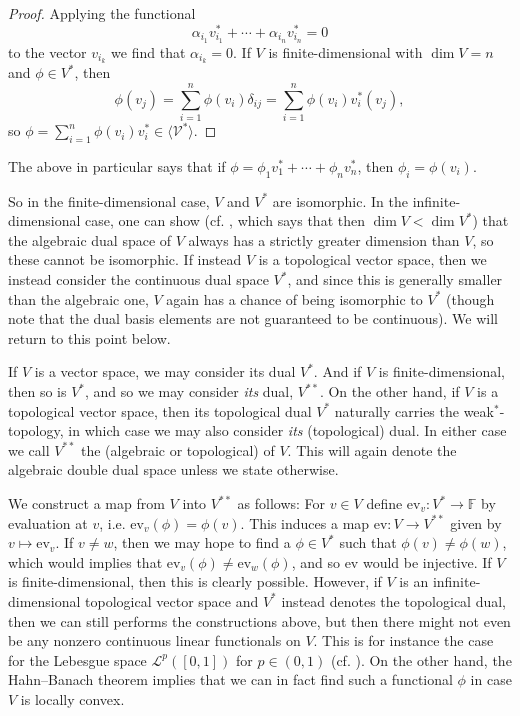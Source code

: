 \documentclass[a4paper, 11pt]{memoir}
\newcommand{\ev}{\mathrm{ev}}
\newcommand{\gen}[1]{\langle#1\rangle}
\theoremstyle{plaincustomnumber}
\theoremstyle{changedotbreakcustomnumber}
\newcommand{\calL}{\mathcal{L}}
\newcommand{\calV}{\mathcal{V}}
\newcommand{\field}{\mathbb{F}}
\newcommand{\keyword}[1]{\ifbool{indefinition}{{\itshape #1}}{{\itshape\bfseries #1}}}
\begin{document}
\begin{proof}
    Applying the functional
    \begin{equation*}
        \alpha_{i_1} v_{i_1}^* + \cdots + \alpha_{i_n} v_{i_n}^* = 0
    \end{equation*}
    to the vector $v_{i_k}$ we find that $\alpha_{i_k} = 0$. If $V$ is finite-dimensional with $\dim V = n$ and $\phi \in V^*$, then
    \begin{equation*}
        \phi(v_j)
            = \sum_{i=1}^n \phi(v_i) \delta_{ij}
            = \sum_{i=1}^n \phi(v_i) v_i^*(v_j),
    \end{equation*}
    so $\phi = \sum_{i=1}^n \phi(v_i) v_i^* \in \gen{\calV^*}$.
\end{proof}
%
The above in particular says that if $\phi = \phi_1 v_1^* + \cdots + \phi_n v_n^*$, then $\phi_i = \phi(v_i)$.

So in the finite-dimensional case, $V$ and $V^*$ are isomorphic. In the infinite-dimensional case, one can show (cf. \cite[Theorem~3.12]{romanlinalg}, which says that then $\dim V < \dim V^*$) that the algebraic dual space of $V$ always has a strictly greater dimension than $V$, so these cannot be isomorphic. If instead $V$ is a topological vector space, then we instead consider the continuous dual space $V^*$, and since this is generally smaller than the algebraic one, $V$ again has a chance of being isomorphic to $V^*$ (though note that the dual basis elements are not guaranteed to be continuous). We will return to this point below.


\newpar

If $V$ is a vector space, we may consider its dual $V^*$. And if $V$ is finite-dimensional, then so is $V^*$, and so we may consider \emph{its} dual, $V^{**}$. On the other hand, if $V$ is a topological vector space, then its topological dual $V^*$ naturally carries the weak$^*$-topology, in which case we may also consider \emph{its} (topological) dual. In either case we call $V^{**}$ the (algebraic or topological) \keyword{double dual space} of $V$. This will again denote the algebraic double dual space unless we state otherwise.

We construct a map from $V$ into $V^{**}$ as follows: For $v \in V$ define $\ev_v \colon V^* \to \field$ by evaluation at $v$, i.e. $\ev_v(\phi) = \phi(v)$. This induces a map $\ev \colon V \to V^{**}$ given by $v \mapsto \ev_v$. If $v \neq w$, then we may hope to find a $\phi \in V^*$ such that $\phi(v) \neq \phi(w)$, which would implies that $\ev_v(\phi) \neq \ev_w(\phi)$, and so $\ev$ would be injective. If $V$ is finite-dimensional, then this is clearly possible. However, if $V$ is an infinite-dimensional topological vector space and $V^*$ instead denotes the topological dual, then we can still performs the constructions above, but then there might not even be any nonzero continuous linear functionals on $V$. This is for instance the case for the Lebesgue space $\calL^p([0,1])$ for $p \in (0,1)$ (cf. \cite[§1.47]{rudinfunctional}). On the other hand, the Hahn--Banach theorem implies that we can in fact find such a functional $\phi$ in case $V$ is locally convex.
\end{document}
